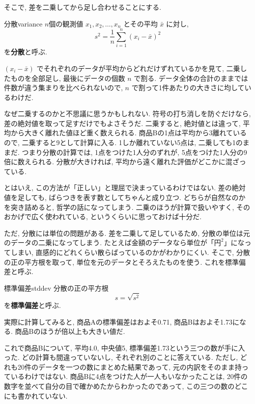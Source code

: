     そこで, 差を二乗してから足し合わせることにする.

    \begin{defi}{分散}{variance}
      $n$個の観測値 $x_1, x_2, \ldots, x_n$ とその平均 $\bar{x}$ に対し,
      \[
        s^2 = \frac{1}{n} \sum_{i=1}^{n} (x_i - \bar{x})^2
      \]
      を\textbf{分散}と呼ぶ.
    \end{defi}

    $(x_i - \bar{x})$ でそれぞれのデータが平均からどれだけずれているかを見て, 二乗したものを全部足し, 最後にデータの個数 $n$ で割る.
    データ全体の合計のままでは件数が違う集まりを比べられないので, $n$ で割って1件あたりの大きさに均しているわけだ.

    なぜ二乗するのかと不思議に思うかもしれない.
    符号の打ち消しを防ぐだけなら, 差の絶対値を取って足すだけでもよさそうだ.
    二乗すると, 絶対値とは違って, 平均から大きく離れた値ほど重く数えられる.
    商品Bの1点は平均から3離れているので, 二乗すると9として計算に入る.
    1しか離れていない5点は, 二乗しても1のままだ.
    つまり分散の計算では, 1点をつけた1人分のずれが, 5点をつけた1人分の9倍に数えられる.
    分散が大きければ, 平均から遠く離れた評価がどこかに混ざっている.

    とはいえ, この方法が「正しい」と理屈で決まっているわけではない.
    差の絶対値を足しても, ばらつきを表す数としてちゃんと成り立つ.
    どちらが自然なのかを突き詰めると, 哲学の話になってしまう.
    二乗のほうが計算で扱いやすく, そのおかげで広く使われている, というくらいに思っておけば十分だ.

    ただ, 分散には単位の問題がある.
    差を二乗して足しているため, 分散の単位は元のデータの二乗になってしまう.
    たとえば金額のデータなら単位が「$\text{円}^2$」になってしまい, 直感的にどれくらい散らばっているのかがわかりにくい.
    そこで, 分散の正の平方根を取って, 単位を元のデータとそろえたものを使う. これを標準偏差と呼ぶ.

    \begin{defi}{標準偏差}{stddev}
      分散の正の平方根
      \[
        s = \sqrt{s^2}
      \]
      を\textbf{標準偏差}と呼ぶ.
    \end{defi}

    実際に計算してみると, 商品Aの標準偏差はおよそ0.71, 商品Bはおよそ1.73になる.
    商品Bのほうが倍以上も大きい値だ.

    これで商品Bについて, 平均4.0, 中央値5, 標準偏差1.73という三つの数が手に入った.
    どの計算も間違っていないし, それぞれ別のことに答えている.
    ただし, どれも20件のデータを一つの数にまとめた結果であって, 元の内訳をそのまま持っているわけではない.
    商品Bに4点をつけた人が一人もいなかったことは, 20件の数字を並べて自分の目で確かめたからわかったのであって, この三つの数のどこにも書かれていない.


